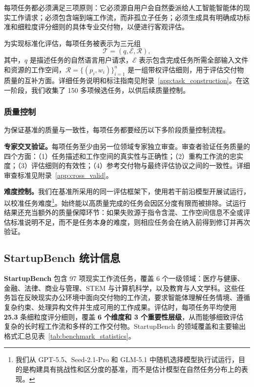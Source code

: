 每项任务都必须满足三项原则：它必须源自用户会自然委派给人工智能智能体的现实工作请求；必须包含端到端工作流，而非孤立子任务；必须生成具有明确成功标准和细粒度评分细则的具体专业交付物，以便进行客观评估。

为实现标准化评估，每项任务被表示为三元组
\[
\mathcal{T}=(q,\mathcal{E},\mathcal{R}),
\]
其中，$q$ 是描述任务的自然语言用户请求，$\mathcal{E}$ 表示包含完成任务所需全部输入文件和资源的工作空间，$\mathcal{R}=\{(p_i,w_i)\}_{i=1}^{n}$ 是一组带权评估细则，用于评估交付物质量的互补方面。详细任务说明和标注指南见附录~\ref{app:task_construction}。在这一阶段，我们收集了 150 多项候选任务，以供后续质量控制。

\subsubsection{质量控制}
为保证基准的质量与一致性，每项任务都要经历以下多阶段质量控制流程。

\textbf{专家交叉验证。}每项任务至少由另一位领域专家独立审查。审查者验证任务质量的四个方面：（1）任务描述和工作空间的真实性与正确性；（2）重构工作流的忠实度；（3）评估细则的有效性；（4）参考交付物与最终评估协议之间的一致性。详细审查标准见附录~\ref{app:cross_valid}。

\textbf{难度控制。}我们在基准所采用的同一评估框架下，使用若干前沿模型开展试运行，以校准任务难度\footnote{我们从 GPT-5.5、Seed-2.1-Pro 和 GLM-5.1 中随机选择模型执行试运行，目的是构建具有挑战性和区分度的基准，而不是估计模型在自然任务分布上的表现。}。始终能以高质量完成的任务会因区分度有限而被排除。试运行结果还充当额外的质量保障环节：如果失败源于指令含混、工作空间信息不全或评估标准说明不足，而不是任务本身的难度，则相应任务会在纳入前得到修订并再次验证。

\subsection{StartupBench 统计信息}
\textbf{StartupBench} 包含 97 项现实工作流任务，覆盖 6 个一级领域：医疗与健康、金融、法律、商业与管理、STEM 与计算机科学，以及教育与人文学科。这些任务旨在反映现实办公环境中面向交付物的工作流，要求智能体理解任务情境、遵循复杂约束、处理异构文件并生成可用的工作成果。评估时，每项任务平均使用 \textbf{25.3} 条细粒度评分细则，覆盖 \textbf{6 个维度和 3 个重要性层级}，从而能够细致评估复杂的长时程工作流和多样的工作交付物。StartupBench 的领域覆盖和主要输出格式汇总见表~\ref{tab:benchmark_statistics}。

